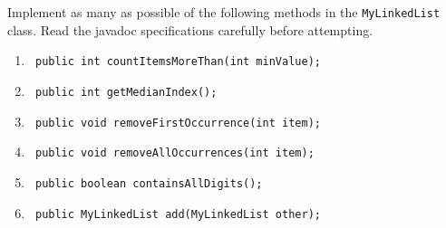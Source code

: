 \begin{questions}
\question Implement as many as possible of the following methods in the \texttt{MyLinkedList} class. Read the javadoc specifications carefully before attempting.

\begin{enumerate}
\item \texttt{ public int countItemsMoreThan(int minValue);}
	
\item \texttt{ public int getMedianIndex();}
	
\item \texttt{ public void removeFirstOccurrence(int item);}
	
\item \texttt{ public void removeAllOccurrences(int item);}
	
\item \texttt{ public boolean containsAllDigits();}

\item \texttt{ public MyLinkedList add(MyLinkedList other);}
\end{enumerate}

\ifprintanswers

\else
\fi

\end{questions}
	

